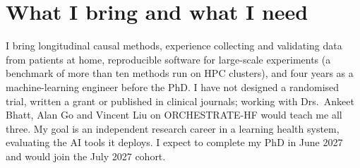 \documentclass[11pt, letterpaper]{article}
\begin{document}
    \section{What I bring and what I need}

    I bring longitudinal causal methods, experience collecting and validating data from patients at home,
    reproducible software for large-scale experiments (a benchmark of more than ten methods run on HPC
    clusters), and four years as a machine-learning engineer before the PhD. I have
    not designed a randomised trial, written a grant or published in clinical journals; working with Drs.\ Ankeet
    Bhatt, Alan Go and Vincent Liu on ORCHESTRATE-HF would teach me all three. My goal is an independent research
    career in a learning health system, evaluating the AI tools it deploys. I expect to complete my PhD in June
    2027 and would join the July 2027 cohort.
\end{document}
